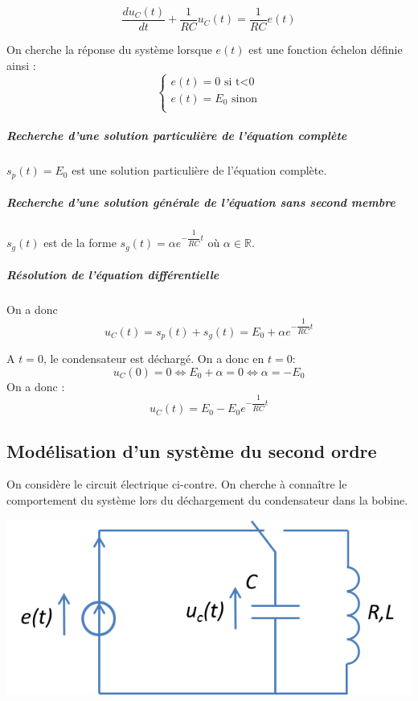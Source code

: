 \documentclass[11pt,oneside]{article}
\begin{document}
$$
\dfrac{du_C(t)}{dt} +  \dfrac{1}{RC}u_C(t) = \dfrac{1}{RC}e(t)
$$

On cherche la réponse du système lorsque $e(t)$ est une fonction échelon définie ainsi :
$$\left\{
\begin{array}{l}
e(t)=0 \text{ si t<0}\\
e(t)=E_0 \text{ sinon}\\
\end{array}
\right.
$$

\subparagraph*{Recherche d'une solution particulière de l'équation complète}
$s_p(t)=E_0$ est une solution particulière de l'équation complète.

\subparagraph*{Recherche d'une solution générale de l'équation sans second membre}
$s_g(t)$ est de la forme $s_g(t)=\alpha e^{ - \dfrac{1}{RC} t}$ où $\alpha \in \mathbb{R}$.


\subparagraph*{Résolution de l'équation différentielle}
On a donc  
$$ u_C(t)=s_p(t) + s_g(t) =E_0 + \alpha  e^{-\dfrac{1}{RC}t}
$$

A $t=0$, le condensateur est déchargé. On a donc en $t=0$: 
$$ 
u_C(0)=0 \Longleftrightarrow E_0 + \alpha   = 0 \Longleftrightarrow \alpha  = -E_0    
$$
On a donc :
$$ u_C(t) = E_0 -E_0 e^{-\dfrac{1}{RC}t}
$$


\subsection{Modélisation d'un système du second ordre}

\begin{minipage}[c]{.6\linewidth}
On considère le circuit électrique ci-contre. On cherche à connaître le comportement du système lors du déchargement du condensateur dans la bobine.
\end{minipage}\hfill
\begin{minipage}[c]{.35\linewidth}
\begin{center}
\includegraphics[width=.9\textwidth]{png/RLC}
\end{center}
\end{minipage}
\end{document}
